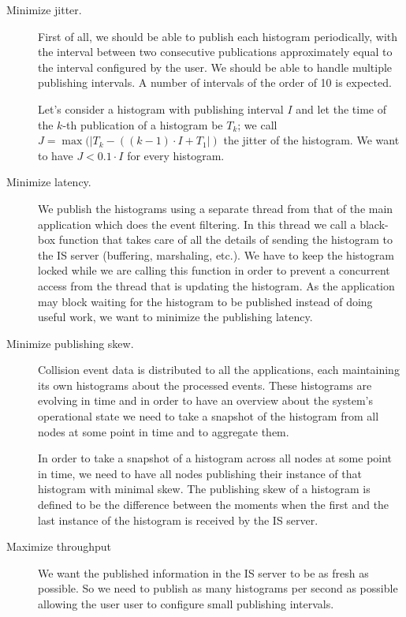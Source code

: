 \begin{description}
\item[Minimize jitter.]

First of all, we should be able to publish each histogram periodically, with the interval between two consecutive publications approximately equal to the interval configured by the user. We should be able to handle multiple publishing intervals. A number of intervals of the order of 10 is expected.

Let's consider a histogram with publishing interval $I$ and let the time of the $k$-th publication of a histogram be $T_k$; we call $J=\max(\lvert T_k-((k-1) \cdot I+T_1\rvert)$ the jitter of the histogram. We want to have $J < 0.1\cdot I$ for every histogram.

\item[Minimize latency.]

We publish the histograms using a separate thread from that of the main application which does the event filtering. In this thread we call a black-box function that takes care of all the details of sending the histogram to the IS server (buffering, marshaling, etc.). We have to keep the histogram locked while we are calling this function in order to prevent a concurrent access from the thread that is updating the histogram. As the application may block waiting for the histogram to be published instead of doing useful work, we want to minimize the publishing latency.

\item [Minimize publishing skew.]

Collision event data is distributed to all the applications, each maintaining its own histograms about the processed events. These histograms are evolving in time and in order to have an overview about the system’s operational state we need to take a snapshot of the histogram from all nodes at some point in time and to aggregate them.

In order to take a snapshot of a histogram across all nodes at some point in time, we need to have all nodes publishing their instance of that histogram with minimal skew. The publishing skew of a histogram is defined to be the difference between the moments when the first and the last instance of the histogram is received by the IS server.  

\item [Maximize throughput]

We want the published information in the IS server to be as fresh as possible. So we need to publish as many histograms per second as possible allowing the user user to configure small publishing intervals.


\end{description}
